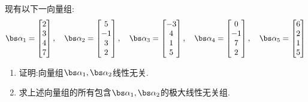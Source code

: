 \documentclass{ctexart}
\begin{document}
\begin{homework}[4]
    现有以下一向量组:
    \[\bs\alpha_1=\begin{bmatrix}
        2\\3\\4\\7
    \end{bmatrix},\quad\bs\alpha_2=\begin{bmatrix}
        5\\-1\\3\\2
    \end{bmatrix},\quad\bs\alpha_3=\begin{bmatrix}
        -3\\4\\1\\5
    \end{bmatrix},\quad\bs\alpha_4=\begin{bmatrix}
        0\\-1\\7\\2
    \end{bmatrix},\quad\bs\alpha_5=\begin{bmatrix}
        6\\2\\1\\5
    \end{bmatrix}\]
    \begin{enumerate}[label=\tbf{(\arabic*)},topsep=0pt,parsep=0pt,itemsep=0pt,partopsep=0pt]
        \item 证明:向量组$\bs\alpha_1,\bs\alpha_2$线性无关.
        \item 求上述向量组的所有包含$\bs\alpha_1,\bs\alpha_2$的极大线性无关组.
    \end{enumerate}
\end{homework}
\end{document}
